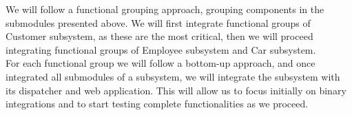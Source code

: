 We will follow a functional grouping approach, grouping components in the submodules presented above. We will first integrate functional groups of Customer subsystem, as these are the most critical, then we will proceed integrating functional groups of Employee subsystem and Car subsystem.
\\

For each functional group we will follow a bottom-up approach, and once integrated all submodules of a subsystem, we will integrate the subsystem with its dispatcher and web application. This will allow us to focus initially on binary integrations and to start testing complete functionalities as we proceed.